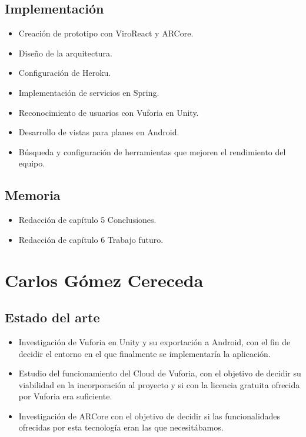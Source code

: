     \subsection{Implementación}
    \label{makereference7.2.3}
        \begin{itemize}
            \item Creación de prototipo con ViroReact y ARCore.
            \item Diseño de la arquitectura.
            \item Configuración de Heroku.
            \item Implementación de servicios en Spring.
            \item Reconocimiento de usuarios con Vuforia en Unity.
            \item Desarrollo de vistas para planes en Android.
            \item Búsqueda y configuración de herramientas que mejoren el
             rendimiento del equipo.
        \end{itemize}
    \subsection{Memoria}
    \label{makereference7.2.3}
        \begin{itemize}
            \item Redacción de capítulo 5 Conclusiones.
            \item Redacción de capítulo 6 Trabajo futuro.
        \end{itemize}

        \section{Carlos Gómez Cereceda}
        \label{makereference7.3}
            \subsection{Estado del arte}
            \label{makereference7.3.1}
                \begin{itemize}
                    \item Investigación de Vuforia en Unity y su exportación a Android, con el fin de decidir el entorno en el que 
                    finalmente se implementaría la aplicación. 
                    \item Estudio del funcionamiento del Cloud de Vuforia, con el objetivo de decidir su viabilidad en la incorporación 
                    al proyecto y si con la licencia gratuita ofrecida por Vuforia era suficiente. 
                    \item Investigación de ARCore con el objetivo de decidir si las funcionalidades ofrecidas por esta tecnología eran las que necesitábamos.
                \end{itemize}
